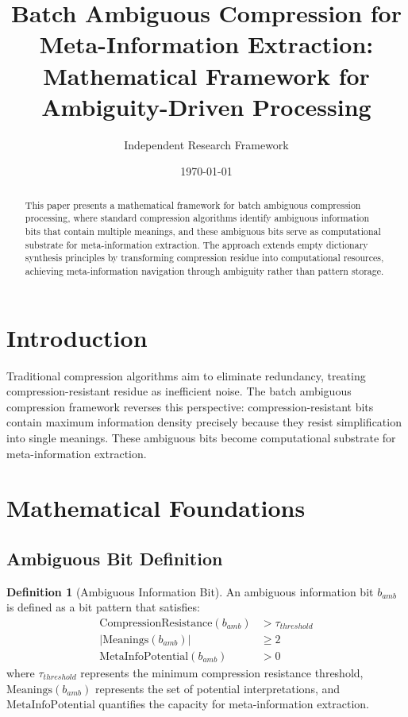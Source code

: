 \documentclass[12pt,a4paper]{article}
\title{\textbf{Batch Ambiguous Compression for Meta-Information Extraction:\\
Mathematical Framework for Ambiguity-Driven Processing}}
\author{Independent Research Framework}
\date{\today}
\theoremstyle{definition}
\newtheorem{definition}{Definition}
\begin{document}
\maketitle

\begin{abstract}
This paper presents a mathematical framework for batch ambiguous compression processing, where standard compression algorithms identify ambiguous information bits that contain multiple meanings, and these ambiguous bits serve as computational substrate for meta-information extraction. The approach extends empty dictionary synthesis principles by transforming compression residue into computational resources, achieving meta-information navigation through ambiguity rather than pattern storage.
\end{abstract}

\section{Introduction}

Traditional compression algorithms aim to eliminate redundancy, treating compression-resistant residue as inefficient noise. The batch ambiguous compression framework reverses this perspective: compression-resistant bits contain maximum information density precisely because they resist simplification into single meanings. These ambiguous bits become computational substrate for meta-information extraction.

\section{Mathematical Foundations}

\subsection{Ambiguous Bit Definition}

\begin{definition}[Ambiguous Information Bit]
An ambiguous information bit $b_{amb}$ is defined as a bit pattern that satisfies:
\begin{align}
\text{CompressionResistance}(b_{amb}) &> \tau_{threshold} \\
|\text{Meanings}(b_{amb})| &\geq 2 \\
\text{MetaInfoPotential}(b_{amb}) &> 0
\end{align}
where $\tau_{threshold}$ represents the minimum compression resistance threshold, $\text{Meanings}(b_{amb})$ represents the set of potential interpretations, and $\text{MetaInfoPotential}$ quantifies the capacity for meta-information extraction.
\end{definition}
\end{document}
